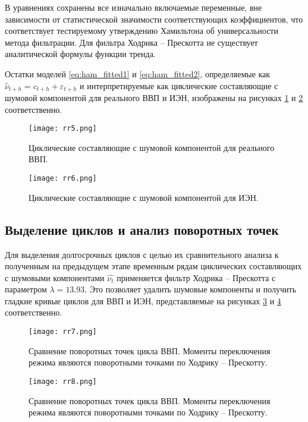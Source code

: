 \documentclass[a4paper,14pt]{extreport}
\begin{document}
	В уравнениях сохранены все изначально включаемые переменные, вне зависимости от статистической значимости соответствующих коэффициентов, что соответствует тестируемому утверждению Хамильтона об универсальности метода фильтрации. Для фильтра Ходрика – Прескотта не существует аналитической формулы функции тренда.

	Остатки моделей \ref{eq:ham_fitted1} и \ref{eq:ham_fitted2}, определяемые как $\hat{\nu}_{t+h} = c_{t+h} + \varepsilon_{t+h}$ и интерпретируемые как циклические составляющие с шумовой компонентой для реального ВВП и ИЭН, изображены на рисунках \ref{fig:rr5} и \ref{fig:rr6} соответственно.
	
	\begin{figure}
		\label{fig:rr5}
		\texttt{[image: rr5.png]}
		\caption{
			Циклические составляющие с шумовой компонентой для реального ВВП.
		}
	\end{figure}	
	
	\begin{figure}
		\label{fig:rr6}
		\texttt{[image: rr6.png]}
		\caption{
			Циклические составляющие с шумовой компонентой для ИЭН.
		}
	\end{figure}	

	\subsection{Выделение циклов и анализ поворотных точек}
	
	Для выделения долгосрочных циклов с целью их сравнительного анализа к полученным на предыдущем этапе временным рядам  циклических составляющих с шумовыми компонентами $\hat{\nu_t}$ применяется фильтр Ходрика – Прескотта с параметром  $\lambda=13.93$. Это позволяет удалить шумовые компоненты и получить гладкие кривые циклов для ВВП и ИЭН, представляемые на рисунках \ref{fig:rr7} и \ref{fig:rr8} соответственно. 
	
	
	\begin{figure}
		\label{fig:rr7}
		\texttt{[image: rr7.png]}
		\caption{
			Сравнение поворотных точек цикла ВВП. Моменты переключения режима являются поворотными точками по Ходрику – Прескотту. 
		}
	\end{figure}	
	
	\begin{figure}
		\label{fig:rr8}
		\texttt{[image: rr8.png]}
		\caption{
			Сравнение поворотных точек цикла ВВП. Моменты переключения режима являются поворотными точками по Ходрику – Прескотту.
		}
	\end{figure}	
	
\end{document}
